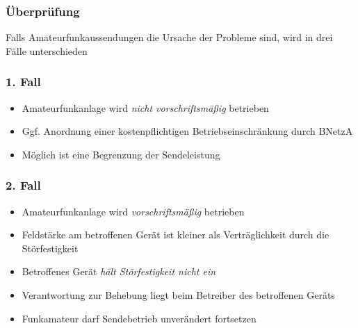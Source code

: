 \begin{frame}
\frametitle{Überprüfung}
Falls Amateurfunkaussendungen die Ursache der Probleme sind, wird in drei Fälle unterschieden

\end{frame}

\begin{frame}
\frametitle{1. Fall}
\begin{itemize}
  \item Amateurfunkanlage wird \emph{nicht vorschriftsmäßig} betrieben
  \item Ggf. Anordnung einer kostenpflichtigen Betriebseinschränkung durch BNetzA
  \item Möglich ist eine Begrenzung der Sendeleistung
  \end{itemize}

\end{frame}

\begin{frame}
\frametitle{2. Fall}
\begin{itemize}
  \item Amateurfunkanlage wird \emph{vorschriftsmäßig} betrieben
  \item Feldstärke am betroffenen Gerät ist kleiner als Verträglichkeit durch die Störfestigkeit
  \item Betroffenes Gerät \emph{hält Störfestigkeit nicht ein}
  \item Verantwortung zur Behebung liegt beim Betreiber des betroffenen Geräts
  \item Funkamateur darf Sendebetrieb unverändert fortsetzen
  \end{itemize}
\end{frame}

